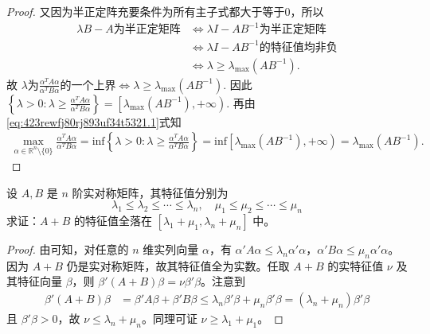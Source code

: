 \documentclass[../../main.tex]{subfiles}%
\begin{document}
\begin{proof}
又因为半正定阵充要条件为所有主子式都大于等于$0$，所以
\begin{align*}
\lambda B-A\text{为半正定矩阵}&\Longleftrightarrow \lambda I-AB^{-1}\text{为半正定矩阵} \\
&\Longleftrightarrow \lambda I-AB^{-1}\text{的特征值均非负} \\
&\Longleftrightarrow \lambda \geqslant \lambda _{\max}\left( AB^{-1} \right) .
\end{align*}
故
$\lambda \text{为}\frac{\alpha ^TA\alpha}{\alpha ^TB\alpha}\text{的一个上界}\Longleftrightarrow \lambda \geqslant \lambda _{\max}\left( AB^{-1} \right) .$
因此
$\left\{ \lambda >0:\lambda \geqslant \frac{\alpha ^TA\alpha}{\alpha ^TB\alpha} \right\} =\left[ \lambda _{\max}\left( AB^{-1} \right) ,+\infty \right) .$
再由\eqref{eq:423rewfj80rj893uf34t5321.1}式知
\begin{align*}
\max_{\alpha \in \mathbb{R} ^n\setminus \{0\}} \frac{\alpha ^TA\alpha}{\alpha ^TB\alpha}=\mathrm{inf}\left\{ \lambda >0:\lambda \geqslant \frac{\alpha ^TA\alpha}{\alpha ^TB\alpha} \right\} =\mathrm{inf}\left[ \lambda _{\max}\left( AB^{-1} \right) ,+\infty \right) =\lambda _{\max}\left( AB^{-1} \right) .
\end{align*}

\end{proof}

\begin{example}\label{example:例9.53}
设 \(A,B\) 是 \(n\) 阶实对称矩阵，其特征值分别为
\[
\lambda_1 \leqslant  \lambda_2 \leqslant  \cdots \leqslant  \lambda_n,\quad \mu_1 \leqslant  \mu_2 \leqslant  \cdots \leqslant  \mu_n
\]
求证：\(A + B\) 的特征值全落在 \([\lambda_1 + \mu_1,\lambda_n + \mu_n]\) 中。
\end{example}
\begin{proof}

由可知，对任意的 \(n\) 维实列向量 \(\alpha\)，有 \(\alpha'A\alpha \leqslant  \lambda_n\alpha'\alpha\)，\(\alpha'B\alpha \leqslant  \mu_n\alpha'\alpha\)。因为 \(A + B\) 仍是实对称矩阵，故其特征值全为实数。任取 \(A + B\) 的实特征值 \(\nu\) 及其特征向量 \(\beta\)，则 \(\beta'(A + B)\beta = \nu\beta'\beta\)。注意到
\begin{align*}
\beta'(A + B)\beta &= \beta'A\beta + \beta'B\beta \leqslant  \lambda_n\beta'\beta + \mu_n\beta'\beta = (\lambda_n + \mu_n)\beta'\beta
\end{align*}
且 \(\beta'\beta > 0\)，故 \(\nu \leqslant  \lambda_n + \mu_n\)。同理可证 \(\nu \geqslant  \lambda_1 + \mu_1\)。 

\end{proof}
\end{document}
